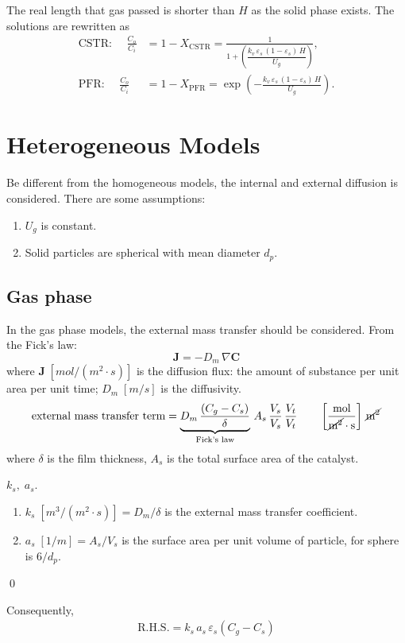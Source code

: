 The real length that gas passed is shorter than $H$ as the solid phase exists. The solutions are rewritten as 
\begin{align}
    \text{CSTR: }\quad
    \frac{C_o}{C_i} &= 1-X_\text{CSTR} 
    = \frac{1}{1+\left(\dfrac{k_v\, \varepsilon_s \,(1-\varepsilon_s) \, H}{U_g}\right)},
    \\
    \text{PFR: }\quad
    \frac{C_o}{C_i} &= 1-X_\text{PFR} 
    = \exp{\left( -\frac{k_v\, \varepsilon_s \, (1-\varepsilon_s) \, H}{U_g} \right)}.
\end{align}

\section{Heterogeneous Models}
Be different from the homogeneous models, the internal and external diffusion is considered. 
There are some assumptions: 
\begin{enumerate}
    \item $U_g$ is constant.
    \item Solid particles are spherical with mean diameter $d_p$.
\end{enumerate}

\subsection{Gas phase}
In the gas phase models, the external mass transfer should be considered. 
From the Fick's law: 
\begin{equation}
    \bm{J} = -D_m \, \nabla \bm{C}
\end{equation}
where $\bm{J}\; [\si{mol/(m^2\cdot s)}]$ is the diffusion flux: the amount of substance per unit area per unit time; 
$D_m \; [\si{m/s}]$ is the diffusivity.
\begin{align}
    \text{external mass transfer term} =
    \underbrace{D_m\,\frac{(C_g-C_s)}{\delta}}_{\text{Fick's law}}
    \,
    A_s 
    \,
    \frac{V_s}{V_s}\,\frac{V_t}{V_t}
    \qquad  \left[\frac{\si{mol}}{\cancel{\si{m^2}} \cdot \si{s}}\right]
            \,
            \cancel{\si{m^2}}
    \label{eq: external dif. - fixed bed}
\end{align}
where $\delta$ is the film thickness, 
$A_s$ is the total surface area of the catalyst.
\begin{definition}
    $k_s,\; a_s$.
    \begin{enumerate}
        \item $k_s\; [\si{m^3/(m^2\cdot s)}] = D_m/\delta$ is the external mass transfer coefficient.
        \item $a_s\; [\si{1/m}] = A_s/V_s$ is the surface area per unit volume of particle, for sphere is $6/d_p$.
    \end{enumerate}
    \qed
\end{definition}
Consequently, 
\begin{align}
    \text{R.H.S.} =
    k_s \, a_s \, \varepsilon_s (C_g - C_s)
    \label{eq: kinetics - accumulation term}
\end{align}

